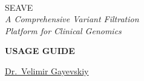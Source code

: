 %
%
%
% 
%
%
%

\begin{titlepage} %

	\centering %
	
	
	\setlength{\unitlength}{0.7\textwidth} %
	
	{}\\[\baselineskip] %
	
	{\fontsize{60pt}{60pt}\selectfont SEAVE}\\[\baselineskip] %
	
	{\Large\textit{A Comprehensive Variant Filtration\\ Platform for Clinical Genomics}}\\ %
	
	{} %
	
	\vfill %
	
	
	{\Large\textbf{\MakeUppercase{Usage Guide}}}\\
	
	{\large\version}
	
	\vfill
	
	
	\href{https://www.vel.nz}{Dr.~Velimir Gayevskiy}

\end{titlepage}
